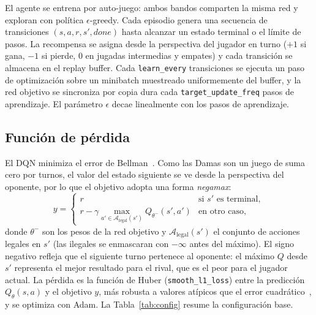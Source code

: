 \documentclass[11pt,a4paper]{article}
\begin{document}
El agente se entrena por auto-juego: ambos bandos comparten la misma red y exploran con política $\epsilon$-greedy. Cada episodio genera una secuencia de transiciones $(s,a,r,s',\textit{done})$ hasta alcanzar un estado terminal o el límite de pasos. La recompensa se asigna desde la perspectiva del jugador en turno ($+1$ si gana, $-1$ si pierde, $0$ en jugadas intermedias y empates) y cada transición se almacena en el replay buffer. Cada \texttt{learn\_every} transiciones se ejecuta un paso de optimización sobre un minibatch muestreado uniformemente del buffer, y la red objetivo se sincroniza por copia dura cada \texttt{target\_update\_freq} pasos de aprendizaje. El parámetro $\epsilon$ decae linealmente con los pasos de aprendizaje.

\subsection{Función de pérdida}

El DQN minimiza el error de Bellman~\cite{bellman1957}. Como las Damas son un juego de suma cero por turnos, el valor del estado siguiente se ve desde la perspectiva del oponente, por lo que el objetivo adopta una forma \emph{negamax}:
\[
y =
\begin{cases}
r & \text{si } s' \text{ es terminal},\\[4pt]
r - \gamma \displaystyle\max_{a' \in \mathcal{A}_{\text{legal}}(s')} Q_{\theta^-}(s', a') & \text{en otro caso},
\end{cases}
\]
donde $\theta^-$ son los pesos de la red objetivo y $\mathcal{A}_{\text{legal}}(s')$ el conjunto de acciones legales en $s'$ (las ilegales se enmascaran con $-\infty$ antes del máximo). El signo negativo refleja que el siguiente turno pertenece al oponente: el máximo $Q$ desde $s'$ representa el mejor resultado para el rival, que es el peor para el jugador actual. La pérdida es la función de Huber (\texttt{smooth\_l1\_loss}) entre la predicción $Q_\theta(s,a)$ y el objetivo $y$, más robusta a valores atípicos que el error cuadrático~\cite{mnih2015}, y se optimiza con Adam. La Tabla~\ref{tab:config} resume la configuración base.
\end{document}
